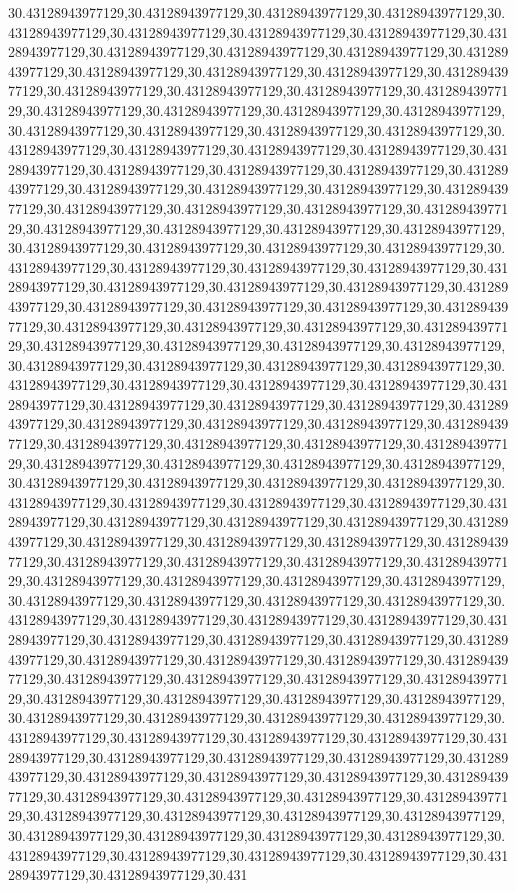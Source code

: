 30.43128943977129,30.43128943977129,30.43128943977129,30.43128943977129,30.43128943977129,30.43128943977129,30.43128943977129,30.43128943977129,30.43128943977129,30.43128943977129,30.43128943977129,30.43128943977129,30.43128943977129,30.43128943977129,30.43128943977129,30.43128943977129,30.43128943977129,30.43128943977129,30.43128943977129,30.43128943977129,30.43128943977129,30.43128943977129,30.43128943977129,30.43128943977129,30.43128943977129,30.43128943977129,30.43128943977129,30.43128943977129,30.43128943977129,30.43128943977129,30.43128943977129,30.43128943977129,30.43128943977129,30.43128943977129,30.43128943977129,30.43128943977129,30.43128943977129,30.43128943977129,30.43128943977129,30.43128943977129,30.43128943977129,30.43128943977129,30.43128943977129,30.43128943977129,30.43128943977129,30.43128943977129,30.43128943977129,30.43128943977129,30.43128943977129,30.43128943977129,30.43128943977129,30.43128943977129,30.43128943977129,30.43128943977129,30.43128943977129,30.43128943977129,30.43128943977129,30.43128943977129,30.43128943977129,30.43128943977129,30.43128943977129,30.43128943977129,30.43128943977129,30.43128943977129,30.43128943977129,30.43128943977129,30.43128943977129,30.43128943977129,30.43128943977129,30.43128943977129,30.43128943977129,30.43128943977129,30.43128943977129,30.43128943977129,30.43128943977129,30.43128943977129,30.43128943977129,30.43128943977129,30.43128943977129,30.43128943977129,30.43128943977129,30.43128943977129,30.43128943977129,30.43128943977129,30.43128943977129,30.43128943977129,30.43128943977129,30.43128943977129,30.43128943977129,30.43128943977129,30.43128943977129,30.43128943977129,30.43128943977129,30.43128943977129,30.43128943977129,30.43128943977129,30.43128943977129,30.43128943977129,30.43128943977129,30.43128943977129,30.43128943977129,30.43128943977129,30.43128943977129,30.43128943977129,30.43128943977129,30.43128943977129,30.43128943977129,30.43128943977129,30.43128943977129,30.43128943977129,30.43128943977129,30.43128943977129,30.43128943977129,30.43128943977129,30.43128943977129,30.43128943977129,30.43128943977129,30.43128943977129,30.43128943977129,30.43128943977129,30.43128943977129,30.43128943977129,30.43128943977129,30.43128943977129,30.43128943977129,30.43128943977129,30.43128943977129,30.43128943977129,30.43128943977129,30.43128943977129,30.43128943977129,30.43128943977129,30.43128943977129,30.43128943977129,30.43128943977129,30.43128943977129,30.43128943977129,30.43128943977129,30.43128943977129,30.43128943977129,30.43128943977129,30.43128943977129,30.43128943977129,30.43128943977129,30.43128943977129,30.43128943977129,30.43128943977129,30.43128943977129,30.43128943977129,30.43128943977129,30.43128943977129,30.43128943977129,30.43128943977129,30.43128943977129,30.43128943977129,30.43128943977129,30.43128943977129,30.43128943977129,30.43128943977129,30.43128943977129,30.43128943977129,30.43128943977129,30.43128943977129,30.43128943977129,30.43128943977129,30.43128943977129,30.43128943977129,30.43128943977129,30.43128943977129,30.43128943977129,30.43128943977129,30.43128943977129,30.43128943977129,30.43128943977129,30.43128943977129,30.43128943977129,30.43128943977129,30.43128943977129,30.43128943977129,30.43128943977129,30.43128943977129,30.43128943977129,30.43128943977129,30.43128943977129,30.43128943977129,30.431